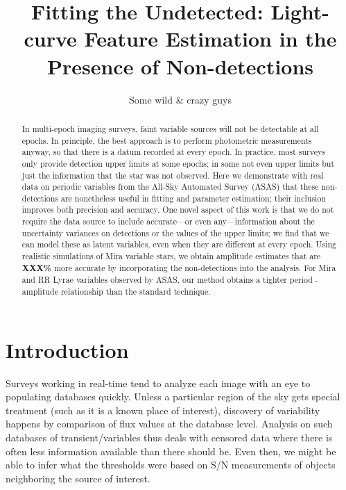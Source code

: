 \documentclass[12pt,preprint]{aastex}
\begin{document}

\shortauthors{}
\title{Fitting the Undetected:  Light-curve Feature Estimation in the Presence of Non-detections}
\author{
Some wild \& crazy guys
}
%



\begin{abstract}
In multi-epoch imaging surveys, faint variable sources will not be
detectable at all epochs.  In principle, the best approach is to
perform photometric measurements anyway, so that there is a datum
recorded at every epoch.  In practice, most surveys only provide
detection upper limits at some epochs; in some not even upper
limits but just the information that the star was not observed.  Here
we demonstrate with real data on periodic variables from the All-Sky
Automated Survey (ASAS) that these non-detections are nonetheless useful in
fitting and parameter estimation; their inclusion improves both
precision and accuracy.  One novel aspect of this work is that we do
not require the data source to include accurate---or even
any---information about the uncertainty variances on detections or the
values of the upper limits; we find that we can model these as latent
variables, even when they are different at every epoch.  Using realistic
simulations of Mira variable stars, we obtain amplitude estimates that
are {\bf XXX\%} more accurate by incorporating the non-detections into
the analysis.  For  Mira and RR Lyrae variables observed by ASAS, our
method obtains a tighter period - amplitude relationship than the standard
technique.
\end{abstract}


\section{Introduction}
\label{sec:intro}



Surveys working in real-time tend to analyze each image with an eye to populating databases quickly. Unless a particular region of the sky gets special treatment (such as it is a known place of interest), discovery of variability happens by comparison of flux values at the database level. Analysis on such databases of transient/variables thus deals with censored data where there is often less information available than there should be. Even then, we might be able to infer what the thresholds were based on S/N measurements of objects neighboring the source of interest.
\end{document}
